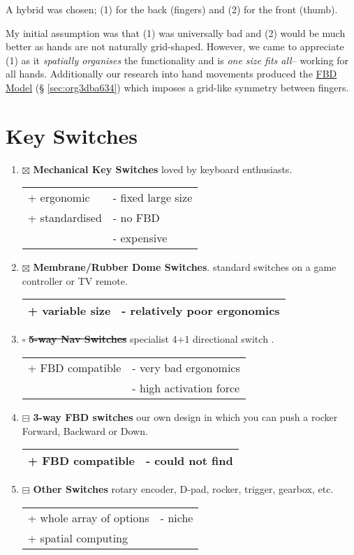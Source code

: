 \documentclass[logo,bsc,singlespacing,parskip]{infthesis}
\begin{document}
A hybrid was chosen; (1) for the back (fingers) and (2) for the front (thumb).

My initial assumption was that (1) was universally bad and (2) would be much better as hands are not naturally grid-shaped.
However, we came to appreciate (1) as it \emph{spatially organises} the functionality and is \emph{one size fits all}-- working for all hands.
Additionally our research into hand movements produced the \hyperref[sec:org3dba634]{FBD Model} (§ \ref{sec:org3dba634}) which imposes a grid-like symmetry between fingers.
\section{Key Switches}
\label{sec:org2f74c29}
\begin{enumerate}
\item{$\boxtimes$} \textbf{Mechanical Key Switches} loved by keyboard enthusiasts.
\begin{longtable}{|p{6.25cm}|p{6.25cm}|}
\hline
+ ergonomic & - fixed large size\\
+ standardised & - no FBD\\
 & - expensive\\
\hline
\end{longtable}
\item{$\boxtimes$} \textbf{Membrane/Rubber Dome Switches}. standard switches on a game controller or TV remote.
\begin{longtable}{|p{6.25cm}|p{6.25cm}|}
\hline
+ variable size & - relatively poor ergonomics\\
\hline
\end{longtable}
\item{$\square$} \sout{\textbf{5-way Nav Switches}} specialist 4+1 directional switch \autocite{Thruhole5wayNavigation}.
\begin{longtable}{|p{6.25cm}|p{6.25cm}|}
\hline
+ FBD compatible & - very bad ergonomics\\
 & - high activation force\\
\hline
\end{longtable}
\item{$\boxminus$} \textbf{3-way FBD switches} our own design in which you can push a rocker Forward, Backward or Down.
\begin{longtable}{|p{6.25cm}|p{6.25cm}|}
\hline
+ FBD compatible & - could not find\\
\hline
\end{longtable}
\item{$\boxminus$} \textbf{Other Switches} rotary encoder, D-pad, rocker, trigger, gearbox, etc.
\begin{longtable}{|p{6.25cm}|p{6.25cm}|}
\hline
+ whole array of options & - niche\\
+ spatial computing & \\
\hline
\end{longtable}
\end{enumerate}
\end{document}
